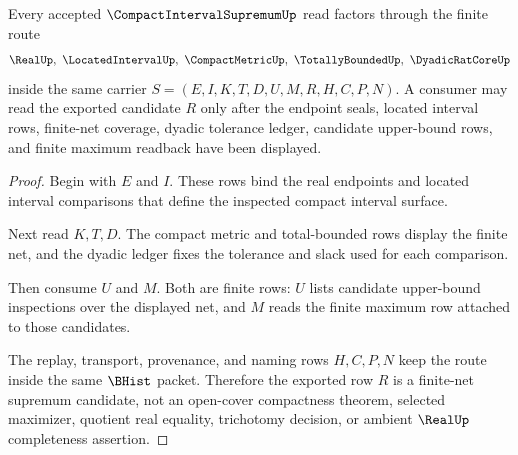 \begin{theorem}
\label{thm:compact-interval-supremum-finite-net-supremum-read}
Every accepted $\CompactIntervalSupremumUp$ read factors through the finite route
$$
\RealUp,\ \LocatedIntervalUp,\ \CompactMetricUp,\ \TotallyBoundedUp,\ \DyadicRatCoreUp
$$
inside the same carrier $S=(E,I,K,T,D,U,M,R,H,C,P,N)$. A consumer may read the exported candidate $R$ only after the endpoint seals, located interval rows, finite-net coverage, dyadic tolerance ledger, candidate upper-bound rows, and finite maximum readback have been displayed.
\end{theorem}
\begin{proof}
Begin with $E$ and $I$. These rows bind the real endpoints and located interval comparisons that define the inspected compact interval surface.

Next read $K,T,D$. The compact metric and total-bounded rows display the finite net, and the dyadic ledger fixes the tolerance and slack used for each comparison.

Then consume $U$ and $M$. Both are finite rows: $U$ lists candidate upper-bound inspections over the displayed net, and $M$ reads the finite maximum row attached to those candidates.

The replay, transport, provenance, and naming rows $H,C,P,N$ keep the route inside the same $\BHist$ packet. Therefore the exported row $R$ is a finite-net supremum candidate, not an open-cover compactness theorem, selected maximizer, quotient real equality, trichotomy decision, or ambient $\RealUp$ completeness assertion.
\end{proof}



